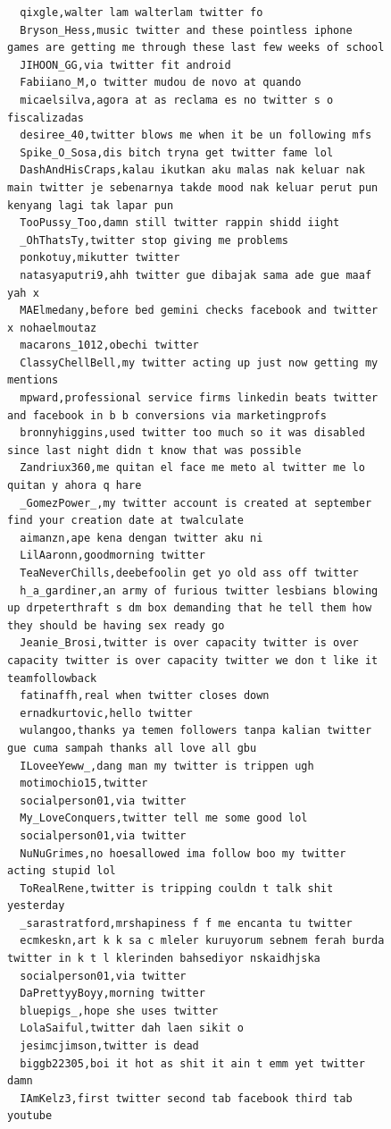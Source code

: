 \begin{figure}[htpb]
\begin{verbatim}
  qixgle,walter lam walterlam twitter fo
  Bryson_Hess,music twitter and these pointless iphone games are getting me through these last few weeks of school
  JIHOON_GG,via twitter fit android
  Fabiiano_M,o twitter mudou de novo at quando
  micaelsilva,agora at as reclama es no twitter s o fiscalizadas
  desiree_40,twitter blows me when it be un following mfs
  Spike_O_Sosa,dis bitch tryna get twitter fame lol
  DashAndHisCraps,kalau ikutkan aku malas nak keluar nak main twitter je sebenarnya takde mood nak keluar perut pun kenyang lagi tak lapar pun
  TooPussy_Too,damn still twitter rappin shidd iight
  _OhThatsTy,twitter stop giving me problems
  ponkotuy,mikutter twitter
  natasyaputri9,ahh twitter gue dibajak sama ade gue maaf yah x
  MAElmedany,before bed gemini checks facebook and twitter x nohaelmoutaz
  macarons_1012,obechi twitter
  ClassyChellBell,my twitter acting up just now getting my mentions
  mpward,professional service firms linkedin beats twitter and facebook in b b conversions via marketingprofs
  bronnyhiggins,used twitter too much so it was disabled since last night didn t know that was possible
  Zandriux360,me quitan el face me meto al twitter me lo quitan y ahora q hare
  _GomezPower_,my twitter account is created at september find your creation date at twalculate
  aimanzn,ape kena dengan twitter aku ni
  LilAaronn,goodmorning twitter
  TeaNeverChills,deebefoolin get yo old ass off twitter
  h_a_gardiner,an army of furious twitter lesbians blowing up drpeterthraft s dm box demanding that he tell them how they should be having sex ready go
  Jeanie_Brosi,twitter is over capacity twitter is over capacity twitter is over capacity twitter we don t like it teamfollowback
  fatinaffh,real when twitter closes down
  ernadkurtovic,hello twitter
  wulangoo,thanks ya temen followers tanpa kalian twitter gue cuma sampah thanks all love all gbu
  ILoveeYeww_,dang man my twitter is trippen ugh
  motimochio15,twitter
  socialperson01,via twitter
  My_LoveConquers,twitter tell me some good lol
  socialperson01,via twitter
  NuNuGrimes,no hoesallowed ima follow boo my twitter acting stupid lol
  ToRealRene,twitter is tripping couldn t talk shit yesterday
  _sarastratford,mrshapiness f f me encanta tu twitter
  ecmkeskn,art k k sa c mleler kuruyorum sebnem ferah burda twitter in k t l klerinden bahsediyor nskaidhjska
  socialperson01,via twitter
  DaPrettyyBoyy,morning twitter
  bluepigs_,hope she uses twitter
  LolaSaiful,twitter dah laen sikit o
  jesimcjimson,twitter is dead
  biggb22305,boi it hot as shit it ain t emm yet twitter damn
  IAmKelz3,first twitter second tab facebook third tab youtube

\end{verbatim}
\end{figure}
